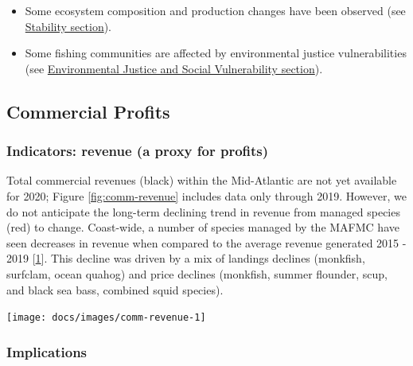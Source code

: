 \documentclass[
  10pt,
]{article}
\providecommand{\tightlist}{%
  \setlength{\itemsep}{0pt}\setlength{\parskip}{0pt}}
\let\origfigure\figure
\let\endorigfigure\endfigure
\renewenvironment{figure}[1][2] {
    \expandafter\origfigure\expandafter[H]
} {
    \endorigfigure
}
\begin{document}
\begin{itemize}
\tightlist
\item
  Some ecosystem composition and production changes have been observed
  (see \protect\hyperlink{stability}{Stability section}).
\item
  Some fishing communities are affected by environmental justice
  vulnerabilities (see
  \protect\hyperlink{social-vulnerability}{Environmental Justice and
  Social Vulnerability section}).
\end{itemize}

\hypertarget{commercial-profits}{%
\subsection{Commercial Profits}\label{commercial-profits}}

\hypertarget{indicators-revenue-a-proxy-for-profits}{%
\subsubsection{Indicators: revenue (a proxy for
profits)}\label{indicators-revenue-a-proxy-for-profits}}

Total commercial revenues (black) within the Mid-Atlantic are not yet
available for 2020; Figure \ref{fig:comm-revenue} includes data only
through 2019. However, we do not anticipate the long-term declining
trend in revenue from managed species (red) to change. Coast-wide, a
number of species managed by the MAFMC have seen decreases in revenue
when compared to the average revenue generated 2015 - 2019
{[}\protect\hyperlink{ref-thunberg_northeast_2021}{1}{]}. This decline
was driven by a mix of landings declines (monkfish, surfclam, ocean
quahog) and price declines (monkfish, summer flounder, scup, and black
sea bass, combined squid species).

\begin{figure}

{\centering \texttt{[image: docs/images/comm-revenue-1]} 

}

\caption{Revenue through 2019 for the for the Mid-Atlantic region: total (black) and from MAFMC managed species (red).}\label{fig:comm-revenue}
\end{figure}

\hypertarget{implications-1}{%
\subsubsection{Implications}\label{implications-1}}
\end{document}
